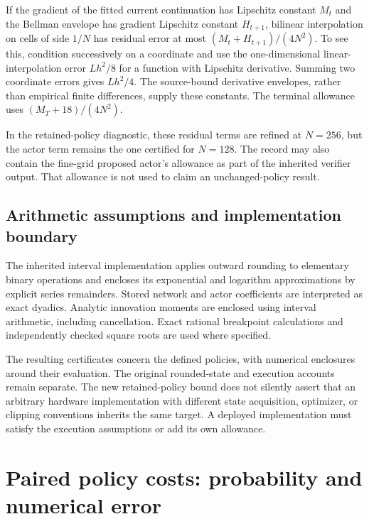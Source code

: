 \documentclass[ecta,nameyear,draft]{econsocart}
\begin{document}
If the gradient of the fitted current continuation has Lipschitz constant $M_t$ and the Bellman envelope has gradient Lipschitz constant $H_{t+1}$, bilinear interpolation on cells of side $1/N$ has residual error at most $(M_t+H_{t+1})/(4N^2)$. To see this, condition successively on a coordinate and use the one-dimensional linear-interpolation error $Lh^2/8$ for a function with Lipschitz derivative. Summing two coordinate errors gives $Lh^2/4$. The source-bound derivative envelopes, rather than empirical finite differences, supply these constants. The terminal allowance uses $(M_T+18)/(4N^2)$.

In the retained-policy diagnostic, these residual terms are refined at $N=256$, but the actor term remains the one certified for $N=128$. The record may also contain the fine-grid proposed actor's allowance as part of the inherited verifier output. That allowance is not used to claim an unchanged-policy result.

\subsection{Arithmetic assumptions and implementation boundary}
The inherited interval implementation applies outward rounding to elementary binary operations and encloses its exponential and logarithm approximations by explicit series remainders. Stored network and actor coefficients are interpreted as exact dyadics. Analytic innovation moments are enclosed using interval arithmetic, including cancellation. Exact rational breakpoint calculations and independently checked square roots are used where specified.

The resulting certificates concern the defined policies, with numerical enclosures around their evaluation. The original rounded-state and execution accounts remain separate. The new retained-policy bound does not silently assert that an arbitrary hardware implementation with different state acquisition, optimizer, or clipping conventions inherits the same target. A deployed implementation must satisfy the execution assumptions or add its own allowance.

\section{Paired policy costs: probability and numerical error}
\end{document}

